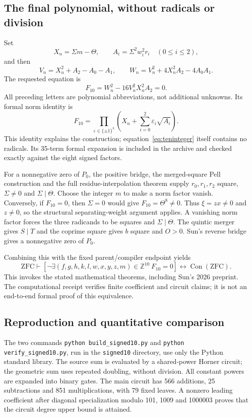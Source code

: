 \subsection{The final polynomial, without radicals or division}

Set
\[
 X_n=\Sigma m-\Theta,\qquad
 A_i=\Sigma^2w_i^2r_i\quad(0\le i\le2),
\]
and then
\[
 V_n=X_n^2+A_2-A_0-A_1,\qquad
 W_n=V_n^2+4X_n^2A_2-4A_0A_1.
\]
The requested equation is
\begin{equation}
 \boxed{F_{10}=W_n^2-16V_n^2X_n^2A_2=0.}
 \label{eq:teninteger}
\end{equation}
All preceding letters are polynomial abbreviations, not additional
unknowns.  Its formal norm identity is
\[
 F_{10}=\prod_{\varepsilon\in\{\pm1\}^3}
 \left(X_n+\sum_{i=0}^2\varepsilon_i\sqrt{A_i}\right).
\]
This identity explains the construction; equation~\eqref{eq:teninteger}
itself contains no radicals.  Its 35-term formal expansion is included
in the archive and checked exactly against the eight signed factors.

For a nonnegative zero of $P_0$, the positive bridge, the merged-square
Pell construction and the full residue-interpolation theorem supply
$r_0,r_1,r_2$ square, $\Sigma\ne0$ and $\Sigma\mid\Theta$.  Choose the
integer $m$ to make a norm factor vanish.  Conversely, if $F_{10}=0$,
then $\Sigma=0$ would give $F_{10}=\Theta^8\ne0$.  Thus $\xi=zx\ne0$
and $z\ne0$, so the structural separating-weight argument applies.
A vanishing norm factor forces the three radicands to be squares and
$\Sigma\mid\Theta$.  The quintic merger gives $S\mid T$ and the
coprime square gives $b$ square and $O>0$.  Sun's reverse bridge gives
a nonnegative zero of $P_0$.

Combining this with the fixed parent/compiler endpoint yields
\[
 \mathrm{ZFC}\vdash
 \left[\neg\exists(f,g,h,k,l,w,x,y,z,m)\in\mathbb Z^{10}\ F_{10}=0\right]
 \longleftrightarrow\operatorname{Con}(\mathrm{ZFC}).
\]
This invokes the stated mathematical theorems, including Sun's 2026
preprint.  The computational receipt verifies finite coefficient and
circuit claims; it is not an end-to-end formal proof of this equivalence.

\subsection{Reproduction and quantitative comparison}

The two commands \texttt{python build\_signed10.py} and
\texttt{python verify\_signed10.py}, run in the \texttt{signed10} directory,
use only the Python standard library.  The source sum is evaluated by a
shared-power Horner circuit; the geometric sum uses repeated doubling,
without division.  All constant powers are expanded into binary gates.
The main circuit has 566 additions, 25 subtractions and 851 multiplications,
with 79 fixed leaves.  A nonzero leading coefficient after diagonal
specialization modulo 101, 1009 and 1000003 proves that the circuit degree
upper bound is attained.

